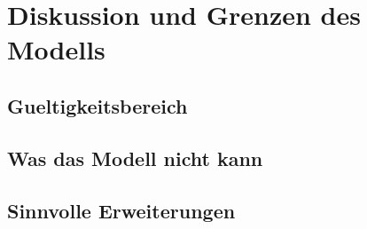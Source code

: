 \section{Diskussion und Grenzen des Modells}
\label{sec:diskussion}


\subsection{Gueltigkeitsbereich}


\subsection{Was das Modell nicht kann}

\subsection{Sinnvolle Erweiterungen}
